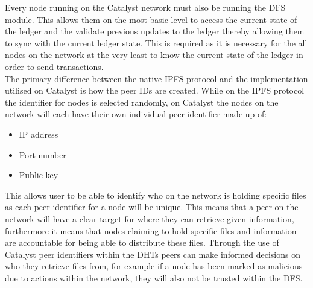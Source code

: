 Every node running on the Catalyst network must also be running the DFS module. This allows them on the most basic level to access the current state of the ledger and the validate previous updates to the ledger thereby allowing them to sync with the current ledger state. This is required as it is necessary for the all nodes on the network at the very least to know the current state of the ledger in order to send transactions. \\

The primary difference between the native IPFS protocol and the implementation utilised on Catalyst is how the peer IDs are created.  While on the IPFS protocol the identifier for nodes is selected randomly, on Catalyst the nodes on the network will each have their own individual peer identifier\cite{BytesExtentions} made up of:

\begin{itemize}
\item IP address
\item Port number
\item Public key
\end{itemize}


This allows user to be able to identify who on the network is holding specific files as each peer identifier for a node will be unique. This means that a peer on the network will have a clear target for where they can retrieve given information, furthermore it means that nodes claiming to hold specific files and information are accountable for being able to distribute these files. Through the use of Catalyst peer identifiers within the DHTs peers can make informed decisions on who they retrieve files from, for example if a node has been marked as malicious due to actions within the network, they will also not be trusted within the DFS.

